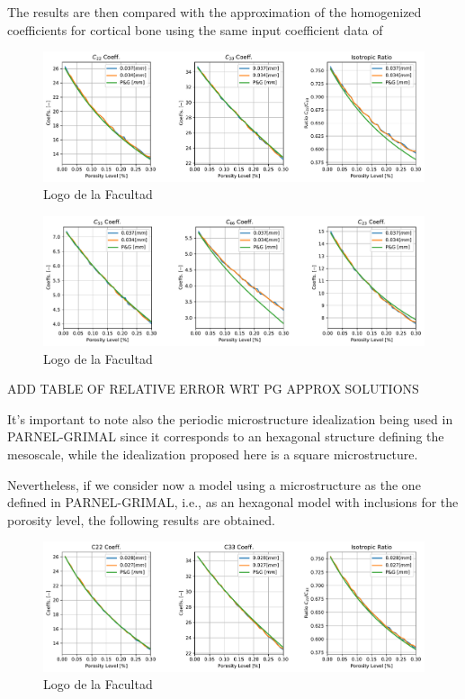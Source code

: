 The results are then compared with the approximation of the homogenized coefficients for cortical bone using the same input coefficient data of \cite{Parnell2008}

\begin{figure}[!h]
	\centering
	\includegraphics[scale=.5]{images/CellsProb/CellProb_MainHomCoeffsCircular.pdf}
	\caption{Logo de la Facultad}
	\label{kldmuytu}
\end{figure}

\begin{figure}[!h]
	\centering
	\includegraphics[scale=.5]{images/CellsProb/CellProb_OthersHomCoeffsCircular.pdf}
	\caption{Logo de la Facultad}
	\label{kldfgdmalsda}
\end{figure}
ADD TABLE OF RELATIVE ERROR WRT PG APPROX SOLUTIONS

\begin{rem}
It's important to note also the periodic microstructure idealization being used in PARNEL-GRIMAL since it corresponds to an hexagonal structure defining the mesoscale, while the idealization proposed here is a square microstructure.
\end{rem}

Nevertheless, if we consider now a model using a microstructure as the one defined in PARNEL-GRIMAL, i.e., as an hexagonal model with inclusions for the porosity level, the following results are obtained.

\begin{figure}[!h]
	\centering
	\includegraphics[scale=.5]{images/CellsProb/CellProb_MainHomCoeffsCircularHexa.pdf}
	\caption{Logo de la Facultad}
	\label{kloiuouda}
\end{figure}

